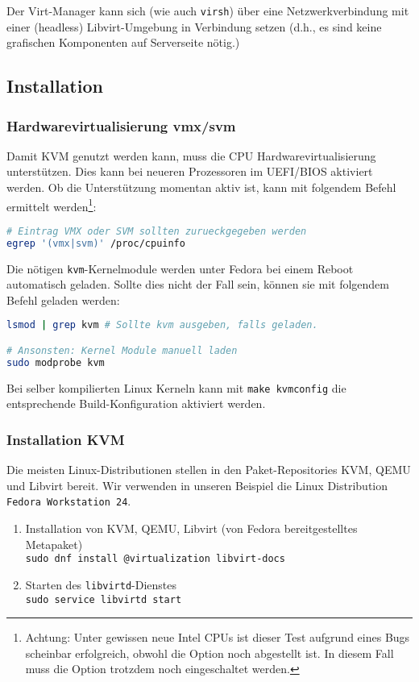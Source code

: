Der Virt-Manager kann sich (wie auch \lstinline|virsh|) über eine Netzwerkverbindung mit einer (headless) Libvirt-Umgebung in Verbindung setzen (d.h., es sind keine grafischen Komponenten auf Serverseite nötig.)

\subsection{Installation}
\subsubsection{Hardwarevirtualisierung vmx/svm}
Damit KVM genutzt werden kann, muss die CPU Hardwarevirtualisierung unterstützen. Dies kann bei neueren Prozessoren im UEFI/BIOS aktiviert werden. Ob die Unterstützung momentan aktiv ist, kann mit folgendem Befehl ermittelt werden\footnote{Achtung: Unter gewissen neue Intel CPUs ist dieser Test aufgrund eines Bugs scheinbar erfolgreich, obwohl die Option noch abgestellt ist. In diesem Fall muss die Option trotzdem noch eingeschaltet werden.}:
\begin{lstlisting}[language=bash]
# Eintrag VMX oder SVM sollten zurueckgegeben werden
egrep '(vmx|svm)' /proc/cpuinfo
\end{lstlisting}


Die nötigen \lstinline|kvm|-Kernelmodule werden unter Fedora bei einem Reboot automatisch geladen. Sollte dies nicht der Fall sein, können sie mit folgendem Befehl geladen werden:
\begin{lstlisting}[language=bash]
lsmod | grep kvm # Sollte kvm ausgeben, falls geladen.

# Ansonsten: Kernel Module manuell laden
sudo modprobe kvm
\end{lstlisting}

Bei selber kompilierten Linux Kerneln kann mit \lstinline|make kvmconfig| die entsprechende Build-Konfiguration aktiviert werden.

\subsubsection{Installation KVM}
Die meisten Linux-Distributionen stellen in den Paket-Repositories KVM, QEMU und Libvirt bereit. Wir verwenden in unseren Beispiel die Linux Distribution \lstinline|Fedora Workstation 24|.

\begin{enumerate}
	\item Installation von KVM, QEMU, Libvirt (von Fedora bereitgestelltes Metapaket)\\ \hfill
		\lstinline|sudo dnf install @virtualization libvirt-docs|
	\item Starten des \lstinline|libvirtd|-Dienstes\\ \hfill
		\lstinline|sudo service libvirtd start|
\end{enumerate}

